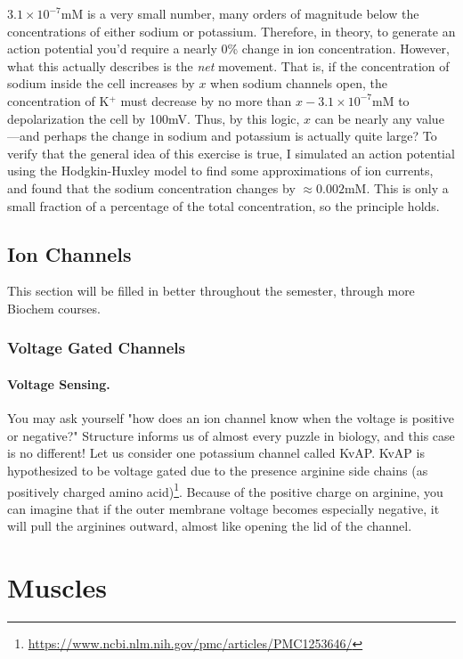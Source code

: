 \documentclass[12pt]{report}
\begin{document}
$3.1 \times 10^{-7} \mathrm{mM}$ is a very small number, many orders of magnitude below the concentrations of either sodium or potassium. Therefore, in theory, to generate an action potential you'd require a nearly 0\% change in ion concentration. However, what this actually describes is the \textit{net} movement. That is, if the concentration of sodium inside the cell increases by $x$ when sodium channels open, the concentration of K$^+$ must decrease by no more than $x - 3.1 \times 10^{-7} \mathrm{mM}$ to depolarization the cell by 100mV. Thus, by this logic, $x$ can be nearly any value---and perhaps the change in sodium and potassium is actually quite large? To verify that the general idea of this exercise is true, I simulated an action potential using the Hodgkin-Huxley model to find some approximations of ion currents, and found that the sodium concentration changes by $\approx 0.002$mM. This is only a small fraction of a percentage of the total concentration, so the principle holds. 




\section{Ion Channels}


This section will be filled in better throughout the semester, through more Biochem courses. 


\subsection{Voltage Gated Channels}


\subsubsection{Voltage Sensing.}
You may ask yourself "how does an ion channel know when the voltage is positive or negative?" Structure informs us of almost every puzzle in biology, and this case is no different! Let us consider one potassium channel called KvAP. KvAP is hypothesized to be voltage gated due to the presence arginine side chains (as positively charged amino acid)\footnote{\url{https://www.ncbi.nlm.nih.gov/pmc/articles/PMC1253646/}}. Because of the positive charge on arginine, you can imagine that if the outer membrane voltage becomes especially negative, it will pull the arginines outward, almost like opening the lid of the channel.


\chapter{Muscles}
\end{document}

